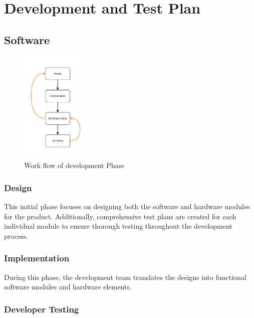 \documentclass[a4paper,12pt]{article}
\begin{document}
	\listoffigures
	\newpage
	

	
	\newpage
	\section{Development and Test Plan}
	
	\subsection{Software }
	
	\begin{figure}[h]
		\centering
		\includegraphics[width=0.3\textwidth]{d-t} %
		\caption{Work flow of development Phase}
		\label{fig:Work flow of development Phase}
	\end{figure}
	
	 \subsubsection{Design}
	
	This initial phase focuses on designing both the software and hardware modules for the product. Additionally, comprehensive test plans are created for each individual module to ensure thorough testing throughout the development process.
	
	 \subsubsection{Implementation}
	
	During this phase, the development team translates the designs into functional software modules and hardware elements.
	
 \subsubsection{Developer Testing}
	
\end{document}
